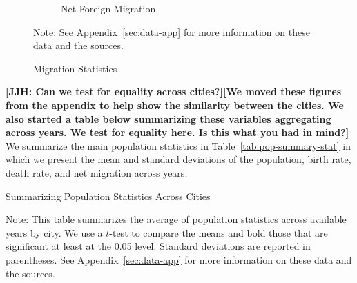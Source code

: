 \begin{figure}[H]
\begin{center}
\begin{subfigure}[ht]{0.48\textwidth}
        \caption{Net Foreign Migration}
        \end{subfigure}
      \caption{Migration Statistics}  \label{fig:emigr-immigr}
      \end{center}
         \raggedright  Note: See Appendix~\ref{sec:data-app} for more information on these data and the sources.
    \end{figure}
   
   \textbf{[JJH: Can we test for equality across cities?][We moved these figures from the appendix to help show the similarity between the cities. We also started a table below summarizing these variables aggregating across years. We test for equality here. Is this what you had in mind?]}
    We summarize the main population statistics in Table~\ref{tab:pop-summary-stat} in which we present the mean and standard deviations of the population, birth rate, death rate, and net migration across years.
    

    \begin{table}[H]
    \centering
    \caption{Summarizing Population Statistics Across Cities} \label{tab:pop-summary-stat}
    \begin{threeparttable}
	
	
\begin{tablenotes}
\item \footnotesize Note: This table summarizes the average of population statistics across available years by city. We use a $t$-test to compare the means and bold those that are significant at least at the 0.05 level. Standard deviations are reported in parentheses. See Appendix~\ref{sec:data-app} for more information on these data and the sources.
\end{tablenotes}
\end{threeparttable}
\end{table}
	
    